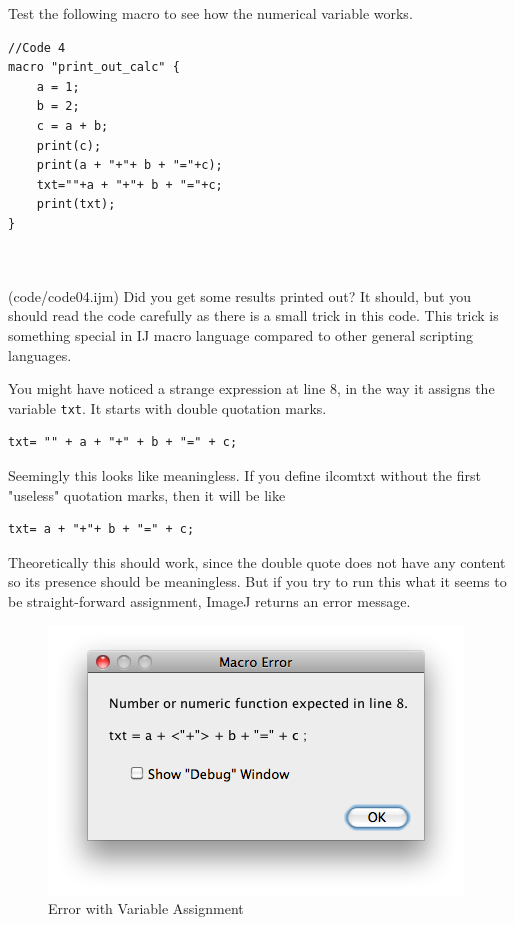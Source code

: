 \documentclass[11pt,a4paper,oneside]{report}
\newcommand{\ilcom}[1]{\texttt{\small#1}}
\begin{document}
Test the following macro to see how the numerical variable works. 

\begin{lstlisting}
//Code 4
macro "print_out_calc" {
	a = 1;
	b = 2;
	c = a + b;
	print(c);
	print(a + "+"+ b + "="+c);
	txt=""+a + "+"+ b + "="+c;
	print(txt);
}



\end{lstlisting}
(code/code04.ijm)
Did you get some results printed out? It should, but you should read the code carefully as there is a small trick in this code.  This trick is something special in IJ macro language compared to other general scripting languages. 

You might have noticed a strange expression at line 8, in the way it assigns the variable \ilcom{txt}. 
It starts with double quotation marks. \\
\begin{lstlisting}[numbers=none]
txt= "" + a + "+" + b + "=" + c;
\end{lstlisting}
Seemingly this looks like meaningless. 
If you define ilcom{txt} without the first "useless" quotation marks, then it will be like\\
\begin{lstlisting}[numbers=none]
txt= a + "+"+ b + "=" + c;
\end{lstlisting}
Theoretically this should work, 
since the double quote does not have any content so its presence should be meaningless. But if you try to run this what it seems to be straight-forward assignment, 
ImageJ returns an error message. 

\begin{figure}[htbp]
\begin{center}
\includegraphics[scale=0.6]{fig/ErrorStringNumericFunction.png}
\caption{Error with Variable Assignment} \label{fig_ErrorVariable}
\end{center}
\end{figure}
\end{document}
